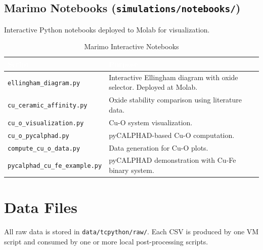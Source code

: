 \documentclass[11pt]{article}
\begin{document}
\subsection{Marimo Notebooks (\texttt{simulations/notebooks/})}

Interactive Python notebooks deployed to Molab for visualization.

\begin{table}[H]
\caption{Marimo Interactive Notebooks}
\label{tab:notebooks}
\centering
\renewcommand{\arraystretch}{1.15}
\footnotesize
\begin{tabular}{|p{2.5in}|p{3.5in}|}
\hline
\rowcolor{headercolor}
\textcolor{white}{\textbf{Script}} & \textcolor{white}{\textbf{Purpose}} \\
\hline
\texttt{ellingham\_diagram.py} & Interactive Ellingham diagram with oxide selector. Deployed at Molab. \\
\hline
\rowcolor{altrow}
\texttt{cu\_ceramic\_affinity.py} & Oxide stability comparison using literature data. \\
\hline
\texttt{cu\_o\_visualization.py} & Cu-O system visualization. \\
\hline
\rowcolor{altrow}
\texttt{cu\_o\_pycalphad.py} & pyCALPHAD-based Cu-O computation. \\
\hline
\texttt{compute\_cu\_o\_data.py} & Data generation for Cu-O plots. \\
\hline
\rowcolor{altrow}
\texttt{pycalphad\_cu\_fe\_example.py} & pyCALPHAD demonstration with Cu-Fe binary system. \\
\hline
\end{tabular}
\end{table}


\newpage
\section{Data Files}
\label{sec:data_files}

All raw data is stored in \texttt{data/tcpython/raw/}. Each CSV is produced by one VM script and consumed by one or more local post-processing scripts.
\end{document}
